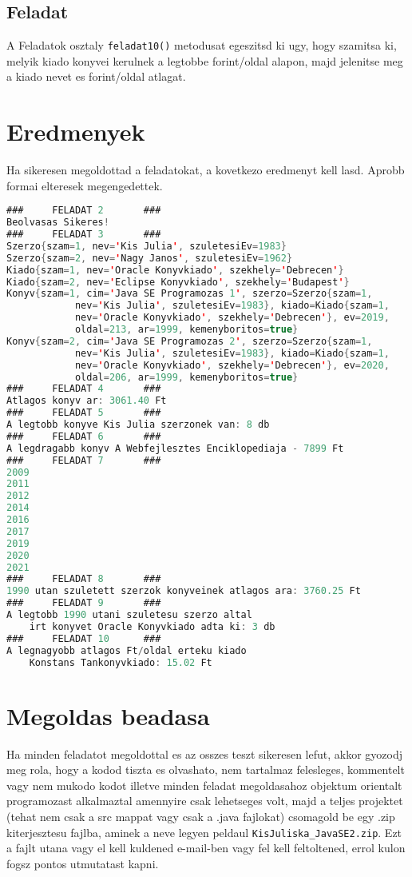 \documentclass{article}
\let\l\lstinline
\begin{document}
\subsection{Feladat}
A Feladatok osztaly \l{feladat10()} metodusat egeszitsd ki ugy, hogy szamitsa ki, melyik kiado konyvei kerulnek a legtobbe forint/oldal alapon, majd jelenitse meg a kiado nevet es forint/oldal atlagat.

\newpage

\section{Eredmenyek}

Ha sikeresen megoldottad a feladatokat, a kovetkezo eredmenyt kell lasd. Aprobb formai elteresek megengedettek.

\begin{lstlisting}[language=Java, caption=Kimenet a feladatok megoldasa utan]
###		FELADAT 2		###
Beolvasas Sikeres!
###		FELADAT 3		###
Szerzo{szam=1, nev='Kis Julia', szuletesiEv=1983}
Szerzo{szam=2, nev='Nagy Janos', szuletesiEv=1962}
Kiado{szam=1, nev='Oracle Konyvkiado', szekhely='Debrecen'}
Kiado{szam=2, nev='Eclipse Konyvkiado', szekhely='Budapest'}
Konyv{szam=1, cim='Java SE Programozas 1', szerzo=Szerzo{szam=1,
            nev='Kis Julia', szuletesiEv=1983}, kiado=Kiado{szam=1,
            nev='Oracle Konyvkiado', szekhely='Debrecen'}, ev=2019,
            oldal=213, ar=1999, kemenyboritos=true}
Konyv{szam=2, cim='Java SE Programozas 2', szerzo=Szerzo{szam=1,
            nev='Kis Julia', szuletesiEv=1983}, kiado=Kiado{szam=1,
            nev='Oracle Konyvkiado', szekhely='Debrecen'}, ev=2020,
            oldal=206, ar=1999, kemenyboritos=true}
###		FELADAT 4		###
Atlagos konyv ar: 3061.40 Ft
###		FELADAT 5		###
A legtobb konyve Kis Julia szerzonek van: 8 db
###		FELADAT 6		###
A legdragabb konyv A Webfejlesztes Enciklopediaja - 7899 Ft
###		FELADAT 7		###
2009
2011
2012
2014
2016
2017
2019
2020
2021
###		FELADAT 8		###
1990 utan szuletett szerzok konyveinek atlagos ara: 3760.25 Ft
###		FELADAT 9		###
A legtobb 1990 utani szuletesu szerzo altal
    irt konyvet Oracle Konyvkiado adta ki: 3 db
###		FELADAT 10		###
A legnagyobb atlagos Ft/oldal erteku kiado
    Konstans Tankonyvkiado: 15.02 Ft
\end{lstlisting}

\newpage

\section{Megoldas beadasa}
Ha minden feladatot megoldottal es az osszes teszt sikeresen lefut, akkor gyozodj meg rola, hogy a kodod tiszta es olvashato, nem tartalmaz felesleges, kommentelt vagy nem mukodo kodot illetve minden feladat megoldasahoz objektum orientalt programozast alkalmaztal amennyire csak lehetseges volt, majd a teljes projektet (tehat nem csak a src mappat vagy csak a .java fajlokat) csomagold be egy .zip kiterjesztesu fajlba, aminek a neve legyen peldaul \lstinline{KisJuliska_JavaSE2.zip}. Ezt a fajlt utana vagy el kell kuldened e-mail-ben vagy fel kell feltoltened, errol kulon fogsz pontos utmutatast kapni.
\end{document}
